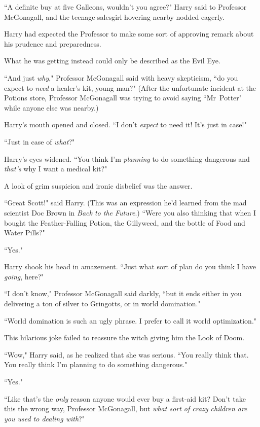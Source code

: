 ``A definite buy at five Galleons, wouldn't you agree?" Harry said to Professor McGonagall, and the teenage salesgirl hovering nearby nodded eagerly.

Harry had expected the Professor to make some sort of approving remark about his prudence and preparedness.

What he was getting instead could only be described as the Evil Eye.

``And just \emph{why}," Professor McGonagall said with heavy skepticism, ``do you expect to \emph{need} a healer's kit, young man?" (After the unfortunate incident at the Potions store, Professor McGonagall was trying to avoid saying ``Mr~Potter" while anyone else was nearby.)

Harry's mouth opened and closed. ``I don't \emph{expect} to need it! It's just in case!"

``Just in case of \emph{what}?"

Harry's eyes widened. ``You think I'm \emph{planning} to do something dangerous and \emph{that's} why I want a medical kit?"

A look of grim suspicion and ironic disbelief was the answer.

``Great Scott!" said Harry. (This was an expression he'd learned from the mad scientist Doc Brown in \emph{Back to the Future}.) ``Were you also thinking that when I bought the Feather-Falling Potion, the Gillyweed, and the bottle of Food and Water Pills?"

``Yes."

Harry shook his head in amazement. ``Just what sort of plan do you think I have \emph{going}, here?"

``I don't know," Professor McGonagall said darkly, ``but it ends either in you delivering a ton of silver to Gringotts, or in world domination."

``World domination is such an ugly phrase. I prefer to call it world optimization."

This hilarious joke failed to reassure the witch giving him the Look of Doom.

``Wow," Harry said, as he realized that she was serious. ``You really think that. You really think I'm planning to do something dangerous."

``Yes."

``Like that's the \emph{only} reason anyone would ever buy a first-aid kit? Don't take this the wrong way, Professor McGonagall, but \emph{what sort of crazy children are you used to dealing with}?"


